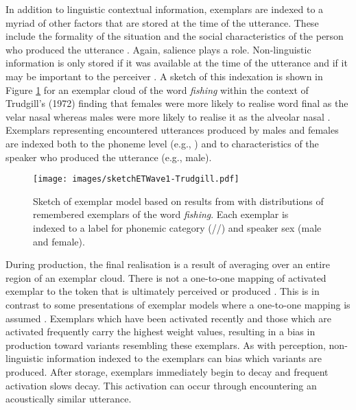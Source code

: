 In addition to linguistic contextual information, exemplars are indexed to a myriad of other factors that are stored at the time of the utterance.  These include the formality of the situation and the social characteristics of the person who produced the utterance \cite{johnson1997,foulkesanddocherty2006}.  Again, salience plays a role. Non-linguistic information is only stored if it was available at the time of the utterance and if it may be important to the perceiver \cite[147]{johnson1997}.  A sketch of this indexation is shown in Figure \ref{fig:with-phoneme-social-labels} for an exemplar cloud of the word \textit{fishing} within the context of Trudgill's (1972) finding that females were more likely to realise word final  as the velar nasal \textipa{[N]} whereas males were more likely to realise it as the alveolar nasal \textipa{[n]}.  Exemplars representing encountered utterances produced by males and females are indexed both to the phoneme level (e.g., ) and to characteristics of the speaker who produced the utterance (e.g., male).  \nocite{trudgill1972}

\begin{figure}
  \texttt{[image: images/sketchETWave1-Trudgill.pdf]}
	\caption{Sketch of exemplar model based on results from \citet{trudgill1972} with distributions of remembered exemplars of the word \textit{fishing}.  Each exemplar is indexed to a label for phonemic category ({/{\ng}/}) and speaker sex (male and female).} 	\label{fig:with-phoneme-social-labels}
	
\end{figure} 


During production, the final realisation is a result of averaging over an entire region of an exemplar cloud. There is not a one-to-one mapping of activated exemplar to the token that is ultimately perceived or produced \cite{pierrehumbert2001}.  This is in contrast to some presentations of exemplar models where a one-to-one mapping is assumed \cite{griffithsetal2007}.  Exemplars which have been activated recently and those which are activated frequently carry the highest weight values, resulting in a bias in production toward variants resembling these exemplars.  As with perception, non-linguistic information indexed to the exemplars can bias which variants are produced.  After storage, exemplars immediately begin to decay and frequent activation slows decay.  This activation can occur through encountering an acoustically similar utterance. 

